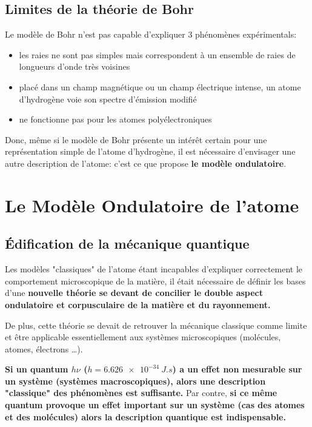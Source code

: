 \documentclass{article}
\begin{document}
\subsection{Limites de la théorie de Bohr}
\noindent Le modèle de Bohr n'est pas capable d'expliquer 3 phénomènes expérimentals:
\begin{itemize}[label=$\ast$]
    \item les raies ne sont pas simples mais correspondent à un ensemble de raies de longueurs
    d'onde très voisines
    \item placé dans un champ magnétique ou un champ électrique intense,
    un atome d'hydrogène voie son spectre d'émission modifié
    \item ne fonctionne pas pour les atomes polyélectroniques
\end{itemize}

\noindent Donc, même si le modèle de Bohr présente un intérêt certain pour une représentation 
simple de l'atome d'hydrogène, il est nécessaire d'envisager une autre description de l'atome: c'est ce que propose \textbf{le modèle ondulatoire}. 


\section{Le Modèle Ondulatoire de l'atome}

\subsection{Édification de la mécanique quantique}

Les modèles "classiques" de l'atome étant incapables d'expliquer correctement le
comportement microscopique de la matière, il était nécessaire de définir les bases
d'une \textbf{nouvelle théorie se devant de concilier le
double aspect ondulatoire et corpusculaire de la matière et du rayonnement.} 

De plus, cette théorie se devait de retrouver la mécanique classique comme limite
et être applicable essentiellement aux systèmes microscopiques
(molécules, atomes, électrons \dots). 

\textbf{Si un quantum $h\nu$ ($h = \qty{6,626e-34}{J.s}$) a un effet non mesurable
sur un système (systèmes macroscopiques), alors une description
"classique" des phénomènes est suffisante.} Par contre, \textbf{si ce même quantum provoque un
effet important sur un système (cas des atomes et des molécules) alors la description quantique est indispensable.}
\end{document}
